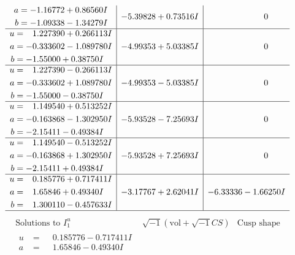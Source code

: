 \documentclass[1p]{elsarticle_modified}
\theoremstyle{definition}
\newcommand{\I}{\sqrt{-1}}
\begin{document}
$$\begin{array}{c|c|c}
\begin{aligned}
a &= -1.16772 + 0.86560 I \\
b &= -1.09338 - 1.34279 I\end{aligned}
 & -5.39828 + 0.73516 I & \phantom{-0.000000 } 0 \\ \hline\begin{aligned}
u &= \phantom{-}1.227390 + 0.266113 I \\
a &= -0.333602 - 1.089780 I \\
b &= -1.55000 + 0.38750 I\end{aligned}
 & -4.99353 + 5.03385 I & \phantom{-0.000000 } 0 \\ \hline\begin{aligned}
u &= \phantom{-}1.227390 - 0.266113 I \\
a &= -0.333602 + 1.089780 I \\
b &= -1.55000 - 0.38750 I\end{aligned}
 & -4.99353 - 5.03385 I & \phantom{-0.000000 } 0 \\ \hline\begin{aligned}
u &= \phantom{-}1.149540 + 0.513252 I \\
a &= -0.163868 - 1.302950 I \\
b &= -2.15411 - 0.49384 I\end{aligned}
 & -5.93528 - 7.25693 I & \phantom{-0.000000 } 0 \\ \hline\begin{aligned}
u &= \phantom{-}1.149540 - 0.513252 I \\
a &= -0.163868 + 1.302950 I \\
b &= -2.15411 + 0.49384 I\end{aligned}
 & -5.93528 + 7.25693 I & \phantom{-0.000000 } 0 \\ \hline\begin{aligned}
u &= \phantom{-}0.185776 + 0.717411 I \\
a &= \phantom{-}1.65846 + 0.49340 I \\
b &= \phantom{-}1.300110 - 0.457633 I\end{aligned}
 & -3.17767 + 2.62041 I & -6.33336 - 1.66250 I\\
 \hline 
 \end{array}$$\newpage$$\begin{array}{c|c|c}  
\text{Solutions to }I^u_{1}& \I (\text{vol} + \sqrt{-1}CS) & \text{Cusp shape}\\
 \hline 
\begin{aligned}
u &= \phantom{-}0.185776 - 0.717411 I \\
a &= \phantom{-}1.65846 - 0.49340 I \\

\end{aligned}
\end{array}$$
\end{document}
